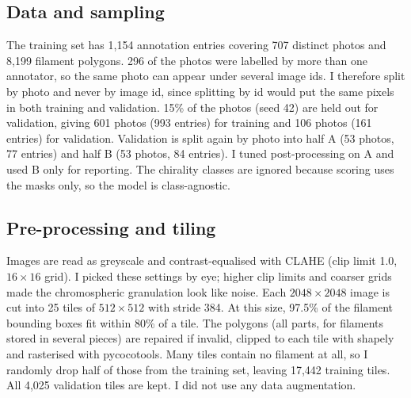 \documentclass[sigconf]{acmart}
\begin{document}
\subsection{Data and sampling}
The training set has 1{,}154 annotation entries covering 707 distinct photos and 8{,}199 filament polygons. 296 of the photos were labelled by more than one annotator, so the same photo can appear under several image ids. I therefore split by photo and never by image id, since splitting by id would put the same pixels in both training and validation. 15\% of the photos (seed 42) are held out for validation, giving 601 photos (993 entries) for training and 106 photos (161 entries) for validation. Validation is split again by photo into half A (53 photos, 77 entries) and half B (53 photos, 84 entries). I tuned post-processing on A and used B only for reporting. The chirality classes are ignored because scoring uses the masks only, so the model is class-agnostic.

\subsection{Pre-processing and tiling}
Images are read as greyscale and contrast-equalised with CLAHE \cite{zuiderveld1994clahe} (clip limit 1.0, $16\times16$ grid). I picked these settings by eye; higher clip limits and coarser grids made the chromospheric granulation look like noise. Each $2048\times2048$ image is cut into 25 tiles of $512\times512$ with stride 384. At this size, 97.5\% of the filament bounding boxes fit within 80\% of a tile. The polygons (all parts, for filaments stored in several pieces) are repaired if invalid, clipped to each tile with shapely and rasterised with pycocotools. Many tiles contain no filament at all, so I randomly drop half of those from the training set, leaving 17{,}442 training tiles. All 4{,}025 validation tiles are kept. I did not use any data augmentation.
\end{document}
